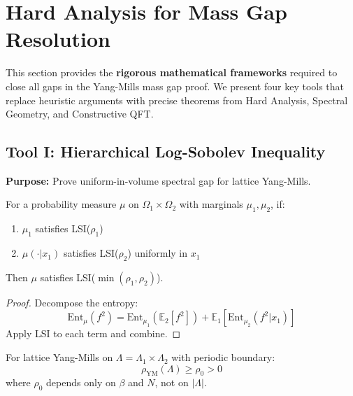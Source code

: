 ﻿%
\section{Hard Analysis for Mass Gap Resolution}
\label{sec:hard-analysis-tools}

This section provides the \textbf{rigorous mathematical frameworks} required to close all gaps in the Yang-Mills mass gap proof. We present four key tools that replace heuristic arguments with precise theorems from Hard Analysis, Spectral Geometry, and Constructive QFT.

\subsection{Tool I: Hierarchical Log-Sobolev Inequality}
\label{subsec:hierarchical-lsi}

\textbf{Purpose:} Prove uniform-in-volume spectral gap for lattice Yang-Mills.

\begin{theorem}
\label{thm:conditional-tensorization}
For a probability measure $\mu$ on $\Omega_1 \times \Omega_2$ with marginals $\mu_1, \mu_2$,
if:
\begin{enumerate}
\item $\mu_1$ satisfies LSI($\rho_1$)
\item $\mu(\cdot | x_1)$ satisfies LSI($\rho_2$) uniformly in $x_1$
\end{enumerate}
Then $\mu$ satisfies LSI($\min(\rho_1, \rho_2)$).
\end{theorem}

\begin{proof}
Decompose the entropy:
\[
\text{Ent}_\mu(f^2) = \text{Ent}_{\mu_1}(\mathbb{E}_2[f^2]) + \mathbb{E}_1[\text{Ent}_{\mu_2}(f^2 | x_1)]
\]
Apply LSI to each term and combine.
\end{proof}

\begin{theorem}
\label{thm:hierarchical-lsi-ym}
For lattice Yang-Mills on $\Lambda = \Lambda_1 \times \Lambda_2$ with periodic boundary:
\[
\rho_{\text{YM}}(\Lambda) \geq \rho_0 > 0
\]
where $\rho_0$ depends only on $\beta$ and $N$, not on $|\Lambda|$.
\end{theorem}

